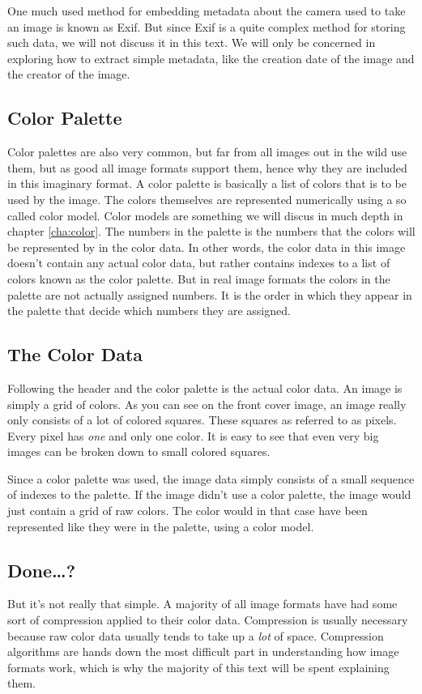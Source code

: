 One much used method for embedding metadata about the camera used to
take an image is known as Exif\cite{camera:_cipa_dc_trans_exchan}. But
since Exif is a quite complex method for storing such data, we will
not discuss it in this text. We will only be concerned in exploring
how to extract simple metadata, like the creation date of the image
and the creator of the image.

\subsection{Color Palette}

Color palettes are also very common, but far from all images out in
the wild use them, but as good all image formats support them, hence
why they are included in this imaginary format. A color palette is
basically a list of colors that is to be used by the image. The colors
themselves are represented numerically using a so called color
model. Color models are something we will discus in much depth in
chapter \ref{cha:color}. The numbers in the palette is the numbers
that the colors will be represented by in the color data. In other
words, the color data in this image doesn't contain any actual color
data, but rather contains indexes to a list of colors known as the
color palette. But in real image formats the colors in the palette are
not actually assigned numbers. It is the order in which they appear in
the palette that decide which numbers they are assigned.

\subsection{The Color Data}

Following the header and the color palette is the actual color data.
An image is simply a grid of colors. As you can see on the front cover
image, an image really only consists of a lot of colored
squares. These squares as referred to as
pixels\cite{murray1996encyclopedia}. Every pixel has \textit{one} and
only one color. It is easy to see that even very big images can be
broken down to small colored squares.

Since a color palette was used, the image data simply consists of a
small sequence of indexes to the palette. If the image didn't use a
color palette, the image would just contain a grid of raw colors. The
color would in that case have been represented like they were in the
palette, using a color model.

\subsection{Done\dots?}

But it's not really that simple. A majority of all image formats have
had some sort of compression applied to their color data. Compression
is usually necessary because raw color data usually tends to take up a
\textit{lot} of space. Compression algorithms are hands down the most
difficult part in understanding how image formats work, which is why
the majority of this text will be spent explaining them.
